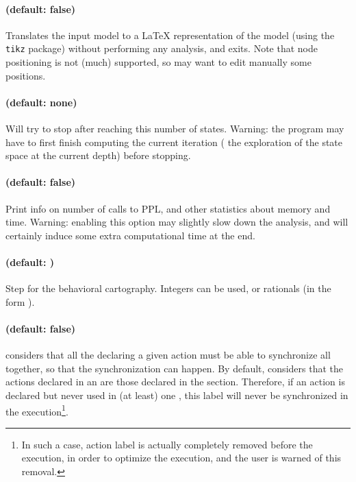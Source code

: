 \paragraph{ (default: false)}
Translates the input model to a \LaTeX{} representation of the model (using the \texttt{tikz} package) without performing any analysis, and exits.
Note that node positioning is not (much) supported, so may want to edit manually some positions.

\paragraph{ (default: none)}
Will try to stop after reaching this number of states.
Warning: the program may have to first finish computing the current iteration (\ie{} the exploration of the state space at the current depth) before stopping.


\paragraph{ (default: false)}
Print info on number of calls to PPL, and other statistics about memory and time.
Warning: enabling this option may slightly slow down the analysis, and will certainly induce some extra computational time at the end.



\paragraph{ (default: )}
Step for the behavioral cartography.
Integers can be used, or rationals (in the form ).

\paragraph{ (default: false)}
\imitator{} considers that all the \IPTA{} declaring a given action must be able to synchronize all together, so that the synchronization can happen.
By default, \imitator{} considers that the actions declared in an \IPTA{} are those declared in the  section.
Therefore, if an action is declared but never used in (at least) one \IPTA{}, this label will never be synchronized in the execution\footnote{In such a case, action label is actually completely removed before the execution, in order to optimize the execution, and the user is warned of this removal.}.

